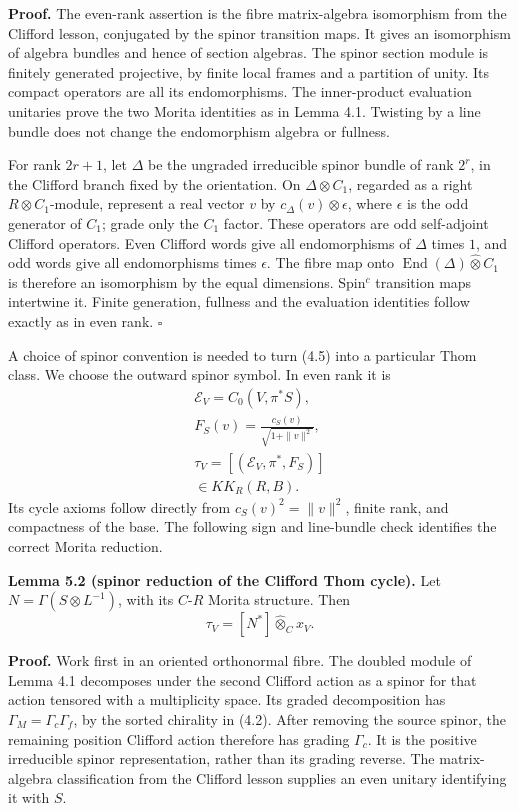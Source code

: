 \documentclass[
  11pt,
]{article}
\begin{document}
\textbf{Proof.} The even-rank assertion is the fibre matrix-algebra
isomorphism from the Clifford lesson, conjugated by the spinor
transition maps. It gives an isomorphism of algebra bundles and hence of
section algebras. The spinor section module is finitely generated
projective, by finite local frames and a partition of unity. Its compact
operators are all its endomorphisms. The inner-product evaluation
unitaries prove the two Morita identities as in Lemma 4.1. Twisting by a
line bundle does not change the endomorphism algebra or fullness.

For rank \(2r+1\), let \(\Delta\) be the ungraded irreducible spinor
bundle of rank \(2^r\), in the Clifford branch fixed by the orientation.
On \(\Delta\otimes C_1\), regarded as a right \(R\otimes C_1\)-module,
represent a real vector \(v\) by \(c_\Delta(v)\otimes\epsilon\), where
\(\epsilon\) is the odd generator of \(C_1\); grade only the \(C_1\)
factor. These operators are odd self-adjoint Clifford operators. Even
Clifford words give all endomorphisms of \(\Delta\) times \(1\), and odd
words give all endomorphisms times \(\epsilon\). The fibre map onto
\(\operatorname{End}(\Delta)\widehat\otimes C_1\) is therefore an
isomorphism by the equal dimensions. Spin\(^{c}\) transition maps
intertwine it. Finite generation, fullness and the evaluation identities
follow exactly as in even rank. \(\square\)

A choice of spinor convention is needed to turn (4.5) into a particular
Thom class. We choose the outward spinor symbol. In even rank it is \[
\begin{gathered}
\mathcal E_V=C_0(V,\pi^*S),\\
F_S(v)=\frac{c_S(v)}{\sqrt{1+\|v\|^2}},\\
\tau_V=[(\mathcal E_V,\pi^*,F_S)]\\
\in KK_R(R,B).
\end{gathered}
\tag{5.4}
\] Its cycle axioms follow directly from \(c_S(v)^2=\|v\|^2\), finite
rank, and compactness of the base. The following sign and line-bundle
check identifies the correct Morita reduction.

\textbf{Lemma 5.2 (spinor reduction of the Clifford Thom cycle).} Let
\(N=\Gamma(S\otimes L^{-1})\), with its \(C\)-\(R\) Morita structure.
Then \[
\tau_V=[N^*]\widehat\otimes_C x_V.
\tag{5.5}
\]

\textbf{Proof.} Work first in an oriented orthonormal fibre. The doubled
module of Lemma 4.1 decomposes under the second Clifford action as a
spinor for that action tensored with a multiplicity space. Its graded
decomposition has \(\Gamma_M=\Gamma_c\Gamma_f\), by the sorted chirality
in (4.2). After removing the source spinor, the remaining position
Clifford action therefore has grading \(\Gamma_c\). It is the positive
irreducible spinor representation, rather than its grading reverse. The
matrix-algebra classification from the Clifford lesson supplies an even
unitary identifying it with \(S\).
\end{document}
